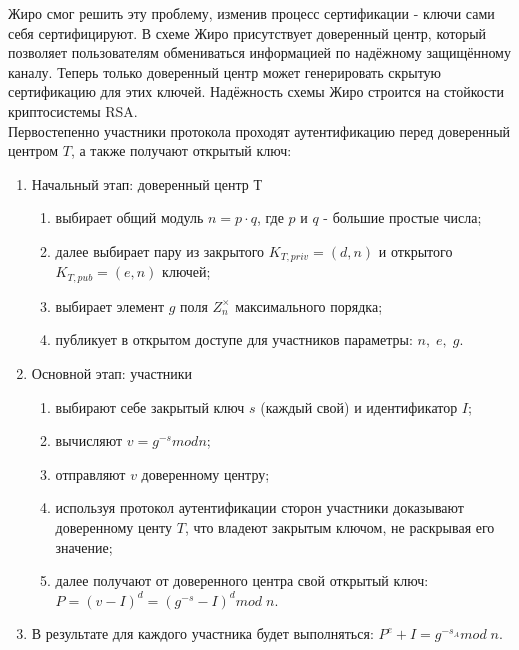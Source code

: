 \documentclass[a4paper]{article}
\begin{document}
Жиро смог решить эту проблему, изменив процесс сертификации - ключи сами себя сертифицируют. В схеме Жиро присутствует доверенный центр,  который позволяет пользователям обмениваться информацией 
по надёжному защищённому каналу. Теперь только доверенный центр может генерировать скрытую сертификацию для этих ключей. 
Надёжность схемы Жиро строится на стойкости криптосистемы RSA.
\\
Первостепенно участники протокола проходят аутентификацию перед доверенный центром $T$, а также получают открытый ключ:
\begin{enumerate}
    \item Начальный этап: доверенный центр Т 
    \begin{enumerate}
        \item выбирает общий модуль $n = p \cdot q$, где $p$ и $q$ - большие простые числа;
        \item далее выбирает пару из закрытого $K_{T, priv} = (d,n)$ и открытого $K_{T, pub}=(e,n)$ ключей; 
        \item выбирает элемент $g$ поля $Z_n^\times$ максимального порядка;
        \item публикует в открытом доступе для участников параметры: $n, \; e, \; g$.
    \end{enumerate}
    \item Основной этап: участники 
    \begin{enumerate}
        \item выбирают себе закрытый ключ $s$ (каждый свой) и идентификатор $I$;
        \item вычисляют $v = g ^{-s} mod n$;
        \item отправляют $v$ доверенному центру;
        \item используя протокол аутентификации сторон участники доказывают доверенному центу $T$, что владеют закрытым ключом, не раскрывая его значение;
        \item далее получают от доверенного центра свой открытый ключ: $P = (v - I)^d = (g^{-s} -I)^d mod \; n$.
    \end{enumerate}
    \item В результате для каждого участника будет выполняться: $P^e+I = g^{-s_A} mod \; n$.
\end{enumerate}
\end{document}
